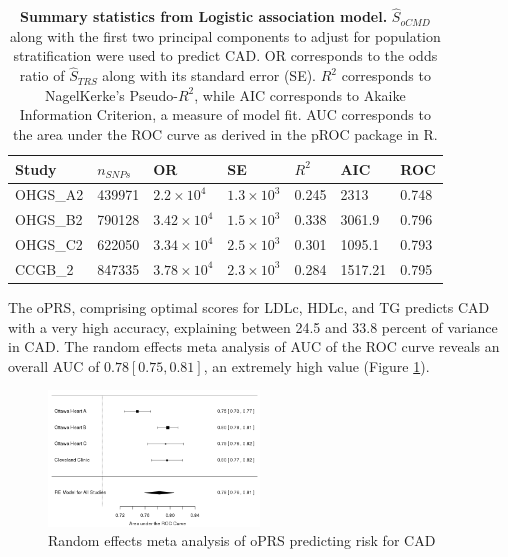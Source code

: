 \begin{table}[H]
\centering

\begin{tabular}{lllllll}
\hline
Study & $n_{SNPs}$ & OR         & SE      & $R^2$     & AIC     & ROC    \\ \hline
OHGS\_A2 & 439971 & $2.2\times10^4$  & $1.3\times10^3$ & 0.245 & 2313    & 0.748 \\
OHGS\_B2 & 790128 & $3.42\times10^4$ & $1.5\times10^3$ & 0.338 & 3061.9  & 0.796 \\
OHGS\_C2 & 622050 & $3.34\times10^4$ & $2.5\times10^3$ & 0.301 & 1095.1  & 0.793 \\
CCGB\_2 & 847335 & $3.78\times10^4$ & $2.3\times10^3$ & 0.284 & 1517.21 & 0.795 \\ \hline
\end{tabular}
\label{oprs_ss}
\caption[Summary statistics from Logistic association model for $\hat{S}_{oCMD}$.]{\textbf{Summary statistics from Logistic association model.} $\hat{S}_{oCMD}$ along with the first two principal components to adjust for population stratification were used to predict \ac{CAD}. OR corresponds to the odds ratio of $\hat{S}_{TRS}$ along with its standard error (SE). $R^2$ corresponds to NagelKerke's Pseudo-$R^2$, while AIC corresponds to Akaike Information Criterion, a measure of model fit. AUC corresponds to the area under the \ac{ROC} curve as derived in the pROC package in R.}
\end{table}

The \ac{oPRS}, comprising optimal scores for \ac{LDLc}, \ac{HDLc}, and \ac{TG} predicts \ac{CAD} with a very high accuracy, explaining between 24.5 and 33.8 percent of variance in \ac{CAD}. The random effects meta analysis of \ac{AUC} of the \ac{ROC} curve reveals an overall \ac{AUC} of $0.78 [0.75, 0.81]$, an extremely high value (Figure \ref{oprs_meta}). 

\begin{figure}[H]
\label{oprs_meta}
\caption{Random effects meta analysis of \ac{oPRS} predicting risk for \ac{CAD}}
\centering
\includegraphics[width=0.5\textwidth]{Figures/oprs_meta.png}
\end{figure}


